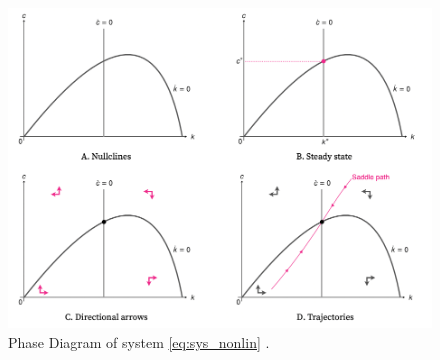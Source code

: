 \documentclass[11pt,a4paper]{book}
\theoremstyle{definition}\newtheorem{definition}{Definition}
\theoremstyle{definition}\newtheorem{fact}{Fact}
\theoremstyle{definition}\newtheorem{remark}{Remark}
\theoremstyle{definition}\newtheorem{ex}{Ex.}
\theoremstyle{definition}\newtheorem{project}{Project}
\theoremstyle{definition}\newtheorem{problem}{Problem}
\theoremstyle{definition}\newtheorem{example}{Example}
\numberwithin{theorem}{section}
\numberwithin{corollary}{chapter}
\numberwithin{assumption}{chapter}
\numberwithin{definition}{chapter}
\numberwithin{prop}{chapter}
\numberwithin{notation}{chapter}
\numberwithin{problem}{chapter}
\numberwithin{example}{chapter}
\numberwithin{fact}{chapter}
\numberwithin{ex}{chapter}
\begin{document}
	\begin{figure}[ht]
		\centering
		\includegraphics[scale=0.4]{figs/phasediag2.png}
		\caption{Phase Diagram of system \eqref{eq:sys_nonlin} \citep{michaillat2023}. }
		\label{fig:phase_diagram}
	\end{figure}
\end{document}
